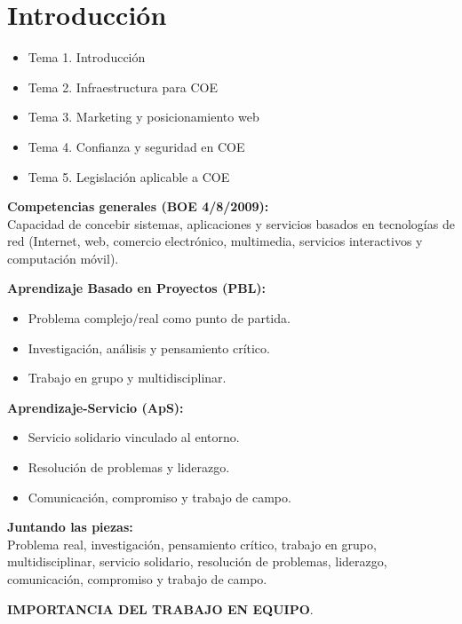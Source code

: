 \documentclass[11pt,a4paper]{article}
\begin{document}
	\section*{Introducción}
	\begin{TemarioBox}
		\begin{itemize}[leftmargin=1.5em]
			\item Tema 1. Introducción
			\item Tema 2. Infraestructura para COE
			\item Tema 3. Marketing y posicionamiento web
			\item Tema 4. Confianza y seguridad en COE
			\item Tema 5. Legislación aplicable a COE
		\end{itemize}
	\end{TemarioBox}

	\begin{ObjetivosBox}
		\textbf{Competencias generales (BOE 4/8/2009):}\\
		Capacidad de concebir sistemas, aplicaciones y servicios basados en tecnologías de red (Internet, web, comercio electrónico, multimedia, servicios interactivos y computación móvil).

		\vspace{0.7em}
		\textbf{Aprendizaje Basado en Proyectos (PBL):}
		\begin{itemize}[leftmargin=1.5em]
			\item Problema complejo/real como punto de partida.
			\item Investigación, análisis y pensamiento crítico.
			\item Trabajo en grupo y multidisciplinar.
		\end{itemize}

		\vspace{0.7em}
		\textbf{Aprendizaje-Servicio (ApS):}
		\begin{itemize}[leftmargin=1.5em]
			\item Servicio solidario vinculado al entorno.
			\item Resolución de problemas y liderazgo.
			\item Comunicación, compromiso y trabajo de campo.
		\end{itemize}

		\vspace{0.7em}
		\textbf{Juntando las piezas:}\\
		Problema real, investigación, pensamiento crítico, trabajo en grupo, multidisciplinar, servicio solidario, resolución de problemas, liderazgo, comunicación, compromiso y trabajo de campo.

		\vspace{0.7em}
		\textbf{IMPORTANCIA DEL TRABAJO EN EQUIPO}.
	\end{ObjetivosBox}
\end{document}
